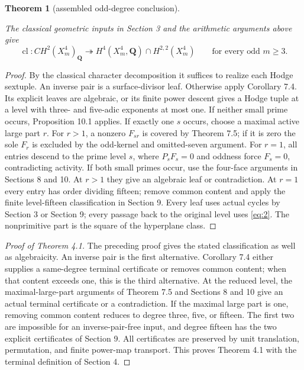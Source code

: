 \documentclass[11pt]{amsart}
\newtheorem{theorem}{Theorem}
\numberwithin{theorem}{section}
\theoremstyle{remark}
\numberwithin{equation}{section}
\begin{document}
\begin{theorem}[assembled odd-degree conclusion]\label{theorem:10.2}

The classical geometric inputs in Section 3 and the arithmetic arguments
above give
\[
\operatorname{cl}:CH^2(X_m^4)_{\mathbf Q}\twoheadrightarrow
H^4(X_m^4,\mathbf Q)\cap H^{2,2}(X_m^4)
\qquad\text{for every odd }m\ge3.
\]

\end{theorem}
\begin{proof}

By the classical character decomposition it suffices to realize each
Hodge sextuple. An inverse pair is a surface-divisor leaf. Otherwise
apply Corollary 7.4. Its explicit leaves are algebraic, or its finite
power descent gives a Hodge tuple at a level with three- and five-adic
exponents at most one. If neither small prime occurs, Proposition 10.1
applies. If exactly one \(s\) occurs, choose a maximal active large
part \(r\). For \(r>1\), a nonzero \(F_{sr}\) is covered by Theorem
7.5; if it is zero the sole \(F_r\) is excluded by the odd-kernel and
omitted-seven argument. For \(r=1\), all entries descend to the prime
level \(s\), where \(P_sF_s=0\) and oddness force \(F_s=0\),
contradicting activity. If both small primes occur, use the four-face
arguments in Sections 8 and 10. At \(r>1\) they give an algebraic leaf
or contradiction. At \(r=1\) every entry has order dividing fifteen;
remove common content and apply the finite level-fifteen classification
in Section 9. Every leaf uses actual cycles by Section 3 or Section 9;
every passage back to the original level uses \eqref{eq:2}. The nonprimitive part
is the square of the hyperplane class.
\end{proof}

\begin{proof}[Proof of Theorem 4.1]

The preceding proof gives the stated classification as well as
algebraicity. An inverse pair is the first alternative. Corollary 7.4
either supplies a same-degree terminal certificate or removes common
content; when that content exceeds one, this is the third alternative.
At the reduced level, the maximal-large-part arguments of Theorem 7.5
and Sections 8 and 10 give an actual terminal certificate or a
contradiction. If the maximal large part is one, removing common content
reduces to degree three, five, or fifteen. The first two are impossible
for an inverse-pair-free input, and degree fifteen has the two explicit
certificates of Section 9. All certificates are preserved by unit
translation, permutation, and finite power-map transport. This proves
Theorem 4.1 with the terminal definition of Section 4.
\end{proof}
\end{document}

